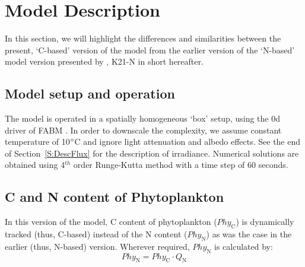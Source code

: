 \documentclass[gmd, manuscript]{copernicus}
\begin{document}
\section{Model Description}
In this section, we will highlight the differences and similarities between the present, `C-based' version of the model from the earlier version of the `N-based' model version presented by \citet{Kerimoglu2021}, K21-N in short hereafter. 

\subsection{Model setup and operation}
The model is operated in a spatially homogeneous `box' setup, using the 0d driver of FABM \citep{Bruggeman2014}. In order to downscale the complexity, we assume constant temperature of 10$^{\circ}$C and ignore light attenuation and albedo effects. See the end of Section~\ref{S:DescFlux} for the description of irradiance. Numerical solutions are obtained using 4$^{th}$ order Runge-Kutta method with a time step of 60 seconds. 

\subsection{C and N content of Phytoplankton}
In this version of the model, C content of phytoplankton ($Phy_\text{C}$) is dynamically tracked (thus, C-based) instead of the N content ($Phy_\text{N}$) as was the case in the earlier (thus, N-based) version. Wherever required, $Phy_\text{N}$ is calculated by:
\begin{equation} \label{eq:Q}
Phy_\text{N} = Phy_\text{C} \cdot Q_\text{N}  
\end{equation}
\end{document}
